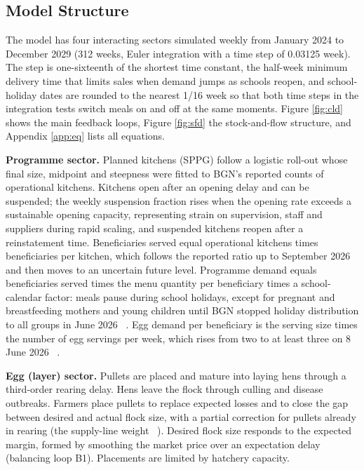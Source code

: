 \documentclass[10pt,twocolumn,a4paper]{article}
\begin{document}
\subsection{Model Structure}

The model has four interacting sectors simulated weekly from January 2024 to December 2029 (312 weeks, Euler integration with a time step of 0.03125 week). The step is one-sixteenth of the shortest time constant, the half-week minimum delivery time that limits sales when demand jumps as schools reopen, and school-holiday dates are rounded to the nearest 1/16 week so that both time steps in the integration tests switch meals on and off at the same moments. Figure \ref{fig:cld} shows the main feedback loops, Figure \ref{fig:sfd} the stock-and-flow structure, and Appendix \ref{app:eq} lists all equations.


\noindent\textbf{Programme sector.} Planned kitchens (SPPG) follow a logistic roll-out whose final size, midpoint and steepness were fitted to BGN's reported counts of operational kitchens. Kitchens open after an opening delay and can be suspended; the weekly suspension fraction rises when the opening rate exceeds a sustainable opening capacity, representing strain on supervision, staff and suppliers during rapid scaling, and suspended kitchens reopen after a reinstatement time. Beneficiaries served equal operational kitchens times beneficiaries per kitchen, which follows the reported ratio up to September 2026 and then moves to an uncertain future level. Programme demand equals beneficiaries served times the menu quantity per beneficiary times a school-calendar factor: meals pause during school holidays, except for pregnant and breastfeeding mothers and young children until BGN stopped holiday distribution to all groups in June 2026 ~\cite{holiday2026}. Egg demand per beneficiary is the serving size times the number of egg servings per week, which rises from two to at least three on 8 June 2026 ~\cite{egg3x2026}.


\noindent\textbf{Egg (layer) sector.} Pullets are placed and mature into laying hens through a third-order rearing delay. Hens leave the flock through culling and disease outbreaks. Farmers place pullets to replace expected losses and to close the gap between desired and actual flock size, with a partial correction for pullets already in rearing (the supply-line weight ~\cite{sterman2000}). Desired flock size responds to the expected margin, formed by smoothing the market price over an expectation delay (balancing loop B1). Placements are limited by hatchery capacity.
\end{document}
